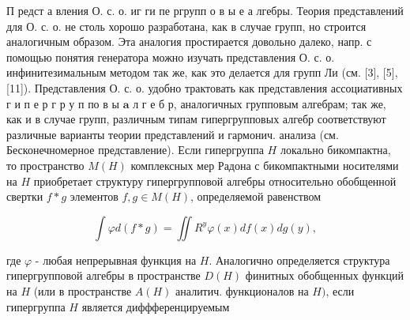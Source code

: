 \documentclass[10pt]{article}
\begin{document}
П редст а вления О. с. о. иг ги пе ргрупп о в ы е а лгебры. Теория представлений для О. с. о. не столь хорошо разработана, как в случае групп, но строится аналогичным образом. Эта аналогия простирается довольно далеко, напр. с помощью понятия генератора можно изучать представления О. с. о. инфинитезимальным методом так же, как это делается для групп Ли (см. [3], [5], [11]). Представления О. с. о. удобно трактовать как представления ассоциативных г и п е р г р у п по в ы $\mathbf{a}$ л г е б р, аналогичных групповым алгебрам; так же, как и в случае групп, различным типам гипергрупповых алгебр соответствуют различные варианты теории представлений и гармонич. анализа (см. Бесконечномерное представление). Если гипергруппа $H$ локально бикомпактна, то пространство $M(H)$ комплексных мер Радона с бикомпактными носителями на $H$ приобретает структуру гипергрупповой алгебры относительно обобщенной свертки $f * g$ элементов $f, g \in M(H)$, определяемой равенством



\[

\int \varphi d(f * g)=\iint R^{y} \varphi(x) d f(x) d g(y),

\]



где $\varphi$ - любая непрерывная функция на $H$. Аналогично определяется структура гипергрупповой алгебры в пространстве $D(H)$ финитных обобщенных функций на $H$ (или в пространстве $A(H)$ аналитич. функционалов на $H)$, если гипергруппа $H$ является диффференцируемым
\end{document}

